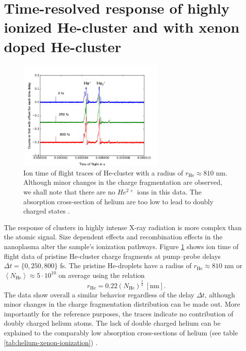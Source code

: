 \section[Time-resolved response of highly ionized He- and HeXe-cluster]{Time-resolved response of highly ionized He-cluster and with xenon doped He-cluster}\label{sec:hexe--and-he-TOF}
\begin{figure}
	\centering
		\includegraphics[width=0.65\textwidth]{images/results/TOF-helium-cluster.png}
	\caption[Time-resolved answer of He-cluster in TOF spectroscopy.]{Ion time of flight traces of He-cluster with a radius of $r_{\text{He}}\approx 810$ nm. Although minor changes in the charge fragmentation are observed, we shall note that there are no $He^{2+}$ ions in this data. The absorption cross-section of helium are too low to lead to doubly charged states \citep{Ho-2016-PC}.}
	\label{fig:TOF-helium-cluster}
\end{figure}
The response of clusters in highly intense X-ray radiation is more complex than the atomic signal. Size dependent effects \citep{Schorb-2012-PRL,Schutte-2015-JPhysB} and recombination effects in the nanoplasma \citep{Schutte-2014-PRL} alter the sample's ionization pathways. Figure \ref{fig:TOF-helium-cluster} shows ion time of flight data of pristine He-cluster charge fragments at pump--probe delays $\Delta t=\{0, 250, 800\}$ fs. The pristine He-droplets have a radius of $r_{\text{He}}\approx 810$ nm or $\left\langle N_{\text{He}}\right\rangle\approx 5\cdot 10^{10}$ on average using the relation \citep{Gomez-2011-JCP}
\begin{equation}
r_{\text{He}}=0.22 (N_{\text{He}})^{\frac{1}{3}}\ [\text{nm}].
\end{equation}
The data show overall a similar behavior regardless of the delay $\Delta t$, although minor changes in the charge fragmentation distribution can be made out. More importantly for the reference purposes, the traces indicate no contribution of doubly charged helium atoms. The lack of double charged helium can be explained to the comparably low absorption cross-sections of helium (see table \ref{tab:helium-xenon-ionization}) \citep{Ho-2016-PC}.\\

